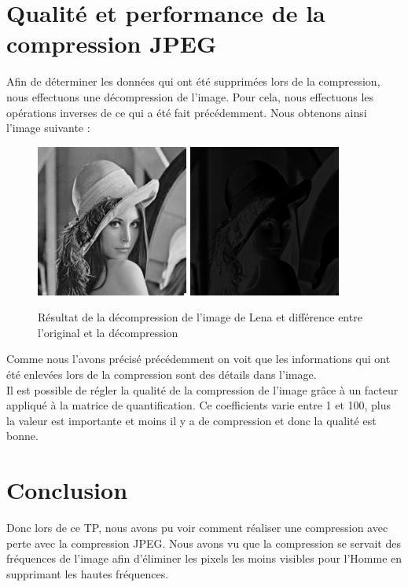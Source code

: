 \documentclass[a4paper,11pt]{article}
\begin{document}
  \section{Qualité et performance de la compression JPEG}
  Afin de déterminer les données qui ont été supprimées lors de la compression, nous effectuons une décompression de l'image.
  Pour cela, nous effectuons les opérations inverses de ce qui a été fait précédemment. Nous obtenons ainsi l'image suivante :
  \begin{figure}[H]
    \center
   \includegraphics[width=5cm]{../result_lena.png}
   \includegraphics[width=5cm]{../diff_lena.png}
   \caption{Résultat de la décompression de l'image de Lena et différence entre l'original et la décompression}
  \end{figure}
  
  Comme nous l'avons précisé précédemment on voit que les informations qui ont été enlevées lors de la compression sont 
  des détails dans l'image.\\
  
  Il est possible de régler la qualité de la compression de l'image grâce à un facteur appliqué à la matrice de quantification.
  Ce coefficients varie entre 1 et 100, plus la valeur est importante et moins il y a de compression et donc la qualité est bonne.\\
  
  
  \section{Conclusion}
  Donc lors de ce TP, nous avons pu voir comment réaliser une compression avec perte avec la compression JPEG. Nous avons vu
  que la compression se servait des fréquences de l'image afin d'éliminer les pixels les moins visibles pour l'Homme en supprimant
  les hautes fréquences.
\end{document}
